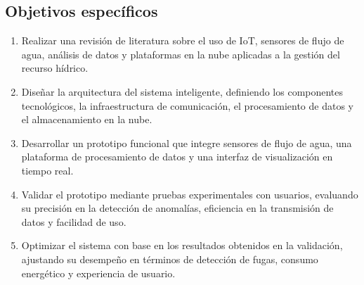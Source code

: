 \documentclass[conference]{IEEEtran}
\begin{document}
\subsection{Objetivos específicos}
\begin{enumerate}
    \item Realizar una revisión de literatura sobre el uso de IoT, sensores de flujo de
          agua, análisis de datos y plataformas en la nube aplicadas a la gestión del
          recurso hídrico.

    \item Diseñar la arquitectura del sistema inteligente, definiendo los componentes
          tecnológicos, la infraestructura de comunicación, el procesamiento de datos y
          el almacenamiento en la nube.

    \item Desarrollar un prototipo funcional que integre sensores de flujo de agua, una
          plataforma de procesamiento de datos y una interfaz de visualización en tiempo
          real.

    \item Validar el prototipo mediante pruebas experimentales con usuarios, evaluando su
          precisión en la detección de anomalías, eficiencia en la transmisión de datos y
          facilidad de uso.

    \item Optimizar el sistema con base en los resultados obtenidos en la validación,
          ajustando su desempeño en términos de detección de fugas, consumo energético y
          experiencia de usuario.

\end{enumerate}
\end{document}
